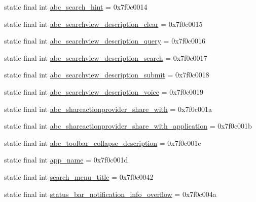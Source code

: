 \begin{DoxyCompactItemize}
\item 
static final int \mbox{\hyperlink{classcom_1_1synnapps_1_1carouselview_1_1_r_1_1string_a04d8e030e5b574c83fd07ebf5b49003e}{abc\+\_\+search\+\_\+hint}} = 0x7f0c0014
\item 
static final int \mbox{\hyperlink{classcom_1_1synnapps_1_1carouselview_1_1_r_1_1string_a897d92a96e5495f1fc09e3901364171f}{abc\+\_\+searchview\+\_\+description\+\_\+clear}} = 0x7f0c0015
\item 
static final int \mbox{\hyperlink{classcom_1_1synnapps_1_1carouselview_1_1_r_1_1string_a79199e0f161130d7f62ebabfa5ad932a}{abc\+\_\+searchview\+\_\+description\+\_\+query}} = 0x7f0c0016
\item 
static final int \mbox{\hyperlink{classcom_1_1synnapps_1_1carouselview_1_1_r_1_1string_a532069816a9226dd6ffd567751aed815}{abc\+\_\+searchview\+\_\+description\+\_\+search}} = 0x7f0c0017
\item 
static final int \mbox{\hyperlink{classcom_1_1synnapps_1_1carouselview_1_1_r_1_1string_a7d5ec76a7bf79f36720ef663da430212}{abc\+\_\+searchview\+\_\+description\+\_\+submit}} = 0x7f0c0018
\item 
static final int \mbox{\hyperlink{classcom_1_1synnapps_1_1carouselview_1_1_r_1_1string_a4890314ee3cd94eb17cb5907b0c73732}{abc\+\_\+searchview\+\_\+description\+\_\+voice}} = 0x7f0c0019
\item 
static final int \mbox{\hyperlink{classcom_1_1synnapps_1_1carouselview_1_1_r_1_1string_a722343905e31e914c4bcf02ea3b2eb90}{abc\+\_\+shareactionprovider\+\_\+share\+\_\+with}} = 0x7f0c001a
\item 
static final int \mbox{\hyperlink{classcom_1_1synnapps_1_1carouselview_1_1_r_1_1string_acfa944f1d94d52b18c70e3c129c6ec92}{abc\+\_\+shareactionprovider\+\_\+share\+\_\+with\+\_\+application}} = 0x7f0c001b
\item 
static final int \mbox{\hyperlink{classcom_1_1synnapps_1_1carouselview_1_1_r_1_1string_a6720e9cad7b1b17b590053baf178ac68}{abc\+\_\+toolbar\+\_\+collapse\+\_\+description}} = 0x7f0c001c
\item 
static final int \mbox{\hyperlink{classcom_1_1synnapps_1_1carouselview_1_1_r_1_1string_a60e3d6b735127e1bf3b745b46a7e8280}{app\+\_\+name}} = 0x7f0c001d
\item 
static final int \mbox{\hyperlink{classcom_1_1synnapps_1_1carouselview_1_1_r_1_1string_aa07365ee46aa22470dbeb04b466cb25f}{search\+\_\+menu\+\_\+title}} = 0x7f0c0042
\item 
static final int \mbox{\hyperlink{classcom_1_1synnapps_1_1carouselview_1_1_r_1_1string_ad6cc2b4f545e49faec2778f35174e913}{status\+\_\+bar\+\_\+notification\+\_\+info\+\_\+overflow}} = 0x7f0c004a
\end{DoxyCompactItemize}
